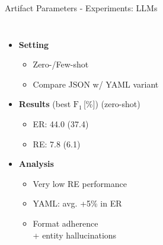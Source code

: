 \documentclass[en,16:9,smallfoot]{sdqbeamer}
\begin{document}
   \begin{frame}{Artifact Parameters - Experiments: LLMs}
   \begin{columns}
           \vspace{-4em}
           \begin{itemize}
               \item \textbf{Setting}
               \begin{itemize}
                   \item Zero-/Few-shot
                   \item Compare JSON w/ YAML variant
               \end{itemize}
               \item \textbf{Results} (best $\text{F}_1$\,[\%]) {\color{contextgrey}(zero-shot)}
               \begin{itemize}
                  \item ER: 44.0 {\color{contextgrey}(37.4)}
                  \item RE: 7.8 {\color{contextgrey}(6.1)}
               \end{itemize}
               \item \textbf{Analysis}
               \begin{itemize}
                  \item Very low RE performance
                  \item YAML: avg. +5\% in ER
                  \item Format adherence\\+ entity hallucinations
               \end{itemize}
           \end{itemize}
        \begin{overlayarea}{\textwidth}{7cm}
\end{overlayarea}
\end{columns}
\end{frame}
\end{document}
